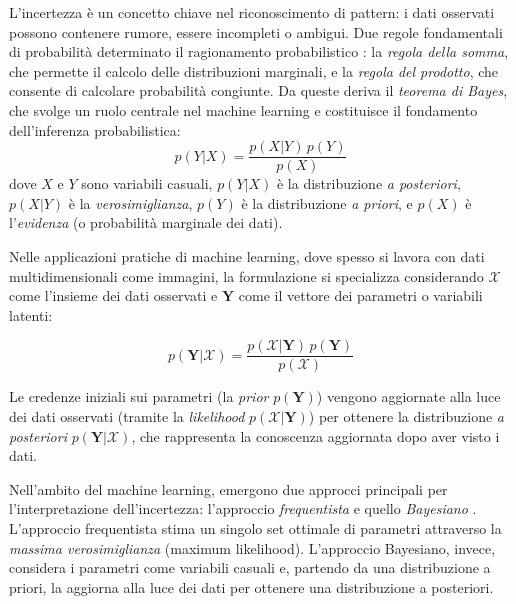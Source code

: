 L'incertezza è un concetto chiave nel riconoscimento di pattern: i dati osservati possono contenere rumore, essere incompleti o ambigui. Due regole fondamentali di probabilità determinato il ragionamento probabilistico \cite[p.~14]{bishop2006pattern}: la \textit{regola della somma}, che permette il calcolo delle distribuzioni marginali, e la \textit{regola del prodotto}, che consente di calcolare probabilità congiunte. Da queste deriva il \textit{teorema di Bayes}, che svolge un ruolo centrale nel machine learning e costituisce il fondamento dell'inferenza probabilistica:
\begin{equation}
p(Y | X) = \frac{p(X | Y) \, p(Y)}{p(X)}
\end{equation}
dove \( X \) e \( Y \) sono variabili casuali, \( p(Y | X) \) è la distribuzione \textit{a posteriori}, \( p(X | Y) \) è la \textit{verosimiglianza}, \( p(Y) \) è la distribuzione \textit{a priori}, e \( p(X) \) è l'\textit{evidenza} (o probabilità marginale dei dati).


Nelle applicazioni pratiche di machine learning, dove spesso si lavora con dati multidimensionali come immagini, la formulazione si specializza considerando \( \mathcal{X} \) come l'insieme dei dati osservati e \( \mathbf{Y} \) come il vettore dei parametri o variabili latenti:

\begin{equation}
p(\mathbf{Y} | \mathcal{X}) = \frac{p(\mathcal{X} | \mathbf{Y}) \, p(\mathbf{Y})}{p(\mathcal{X})}
\label{eq:bayes_applied}
\end{equation}

Le credenze iniziali sui parametri (la \textit{prior} \( p(\mathbf{Y}) \)) vengono aggiornate alla luce dei dati osservati (tramite la \textit{likelihood} \( p(\mathcal{X} | \mathbf{Y}) \)) per ottenere la distribuzione \textit{a posteriori} \( p(\mathbf{Y} | \mathcal{X}) \), che rappresenta la conoscenza aggiornata dopo aver visto i dati.

Nell'ambito del machine learning, emergono due approcci principali per l'interpretazione dell'incertezza: l'approccio \textit{frequentista} e quello \textit{Bayesiano} \cite[pp.~19-22]{bishop2006pattern}. L'approccio frequentista stima un singolo set ottimale di parametri attraverso la \textit{massima ve\-ro\-si\-mi\-glian\-za} (maximum likelihood). L'approccio Ba\-ye\-sia\-no, invece, considera i parametri come variabili casuali e, partendo da una distribuzione a priori, la aggiorna alla luce dei dati per ottenere una distribuzione a posteriori.

